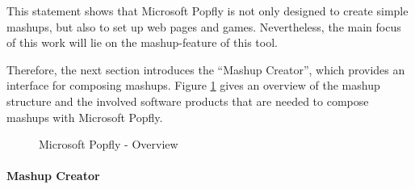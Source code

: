 
\par This statement shows that Microsoft Popfly is not only designed to create simple mashups, but also to set up web pages and games. Nevertheless, the main
focus of this work will lie on the mashup-feature of this tool.

Therefore, the next section introduces the ``Mashup Creator'', which provides an
interface for composing mashups. Figure
\ref{fig:microsoft_popfly_tool_architecture} gives an overview of the mashup structure and the
involved software products that are needed to compose mashups with Microsoft Popfly.

\begin{figure}
	\centering
	\caption{Microsoft Popfly - Overview}
	\label{fig:microsoft_popfly_tool_architecture}
\end{figure}

\paragraph{Mashup Creator}

